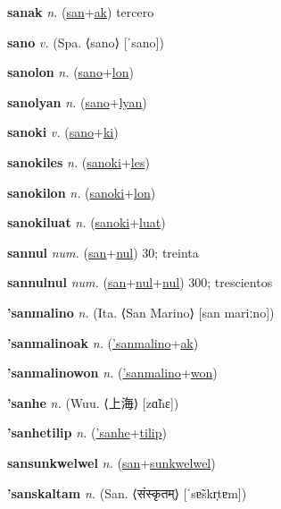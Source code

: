 \textbf{\hypertarget{sanak}{sanak}} \textit{n.} (\hyperlink{san}{san}+\allowbreak \hyperlink{ak}{ak})
tercero

\textbf{\hypertarget{sano}{sano}} \textit{v.} (Spa. ⟨sano⟩ [ˈsano])


\textbf{\hypertarget{sanolon}{sanolon}} \textit{n.} (\hyperlink{sano}{sano}+\allowbreak \hyperlink{lon}{lon})


\textbf{\hypertarget{sanolyan}{sanolyan}} \textit{n.} (\hyperlink{sano}{sano}+\allowbreak \hyperlink{lyan}{lyan})


\textbf{\hypertarget{sanoki}{sanoki}} \textit{v.} (\hyperlink{sano}{sano}+\allowbreak \hyperlink{ki}{ki})


\textbf{\hypertarget{sanokiles}{sanokiles}} \textit{n.} (\hyperlink{sanoki}{sanoki}+\allowbreak \hyperlink{les}{les})


\textbf{\hypertarget{sanokilon}{sanokilon}} \textit{n.} (\hyperlink{sanoki}{sanoki}+\allowbreak \hyperlink{lon}{lon})


\textbf{\hypertarget{sanokiluat}{sanokiluat}} \textit{n.} (\hyperlink{sanoki}{sanoki}+\allowbreak \hyperlink{luat}{luat})


\textbf{\hypertarget{sannul}{sannul}} \textit{num.} (\hyperlink{san}{san}+\allowbreak \hyperlink{nul}{nul})
30; treinta

\textbf{\hypertarget{sannulnul}{sannulnul}} \textit{num.} (\hyperlink{san}{san}+\allowbreak \hyperlink{nul}{nul}+\allowbreak \hyperlink{nul}{nul})
300; trescientos

\textbf{\hypertarget{'sanmalino}{'sanmalino}} \textit{n.} (Ita. ⟨San Marino⟩ [san mariːno])


\textbf{\hypertarget{'sanmalinoak}{'sanmalinoak}} \textit{n.} (\hyperlink{'sanmalino}{'sanmalino}+\allowbreak \hyperlink{ak}{ak})


\textbf{\hypertarget{'sanmalinowon}{'sanmalinowon}} \textit{n.} (\hyperlink{'sanmalino}{'sanmalino}+\allowbreak \hyperlink{won}{won})


\textbf{\hypertarget{'sanhe}{'sanhe}} \textit{n.} (Wuu. ⟨{\chinese{}上海}⟩ [zɑ̃hɛ])


\textbf{\hypertarget{'sanhetilip}{'sanhetilip}} \textit{n.} (\hyperlink{'sanhe}{'sanhe}+\allowbreak \hyperlink{tilip}{tilip})


\textbf{\hypertarget{sansunkwelwel}{sansunkwelwel}} \textit{n.} (\hyperlink{san}{san}+\allowbreak \hyperlink{sunkwelwel}{sunkwelwel})


\textbf{\hypertarget{'sanskaltam}{'sanskaltam}} \textit{n.} (San. ⟨{\devanagari{}संस्कृतम्}⟩ [ˈsɐ̃skr̩tɐm])


